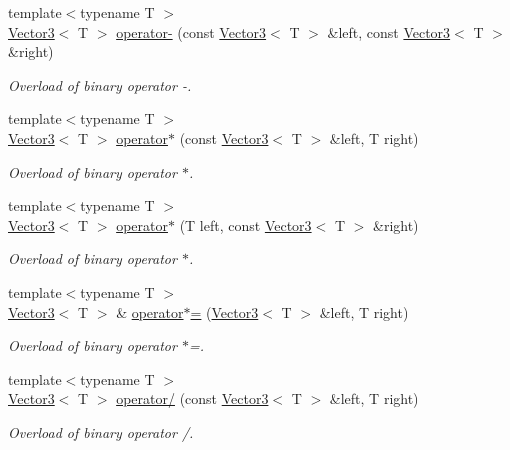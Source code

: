 \begin{DoxyCompactItemize}
{\footnotesize template$<$typename T $>$ }\\\hyperlink{classsf_1_1_vector3}{Vector3}$<$ T $>$ \hyperlink{classsf_1_1_vector3_abe0b9411c00cf807bf8a5f835874bd2a}{operator-\/} (const \hyperlink{classsf_1_1_vector3}{Vector3}$<$ T $>$ \&left, const \hyperlink{classsf_1_1_vector3}{Vector3}$<$ T $>$ \&right)
\begin{DoxyCompactList}\small\item\em Overload of binary operator -\/. \end{DoxyCompactList}\item 
{\footnotesize template$<$typename T $>$ }\\\hyperlink{classsf_1_1_vector3}{Vector3}$<$ T $>$ \hyperlink{classsf_1_1_vector3_a44ec312b31c1a85dcff4863795f98329}{operator$\ast$} (const \hyperlink{classsf_1_1_vector3}{Vector3}$<$ T $>$ \&left, T right)
\begin{DoxyCompactList}\small\item\em Overload of binary operator $\ast$. \end{DoxyCompactList}\item 
{\footnotesize template$<$typename T $>$ }\\\hyperlink{classsf_1_1_vector3}{Vector3}$<$ T $>$ \hyperlink{classsf_1_1_vector3_aa6f2b0d9f79c1b9774759b7087affbb1}{operator$\ast$} (T left, const \hyperlink{classsf_1_1_vector3}{Vector3}$<$ T $>$ \&right)
\begin{DoxyCompactList}\small\item\em Overload of binary operator $\ast$. \end{DoxyCompactList}\item 
{\footnotesize template$<$typename T $>$ }\\\hyperlink{classsf_1_1_vector3}{Vector3}$<$ T $>$ \& \hyperlink{classsf_1_1_vector3_ad5fb972775ce8ab58cd9670789e806a7}{operator$\ast$=} (\hyperlink{classsf_1_1_vector3}{Vector3}$<$ T $>$ \&left, T right)
\begin{DoxyCompactList}\small\item\em Overload of binary operator $\ast$=. \end{DoxyCompactList}\item 
{\footnotesize template$<$typename T $>$ }\\\hyperlink{classsf_1_1_vector3}{Vector3}$<$ T $>$ \hyperlink{classsf_1_1_vector3_ad4ba4a83de236ddeb92a7b759187e90d}{operator/} (const \hyperlink{classsf_1_1_vector3}{Vector3}$<$ T $>$ \&left, T right)
\begin{DoxyCompactList}\small\item\em Overload of binary operator /. \end{DoxyCompactList}\item 

\end{DoxyCompactItemize}
